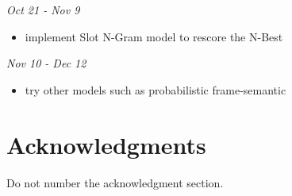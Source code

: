 \documentclass[11pt,letterpaper]{article}
\begin{document}
\noindent \emph{Oct 21 - Nov 9}
\begin{itemize}
  \item implement Slot N-Gram model to rescore the N-Best
\end{itemize}

\noindent \emph{Nov 10 - Dec 12}
\begin{itemize}
  \item try other models such as probabilistic frame-semantic
\end{itemize}

\section*{Acknowledgments}

Do not number the acknowledgment section.
\end{document}
